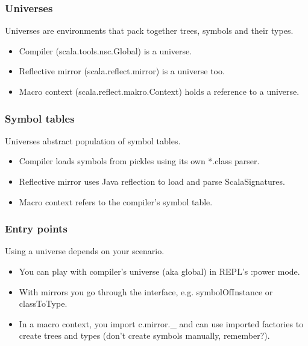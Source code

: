 \documentclass[hyperref={bookmarks=false}]{beamer}
\begin{document}
\begin{frame}[fragile]
\frametitle{Universes}

Universes are environments that pack together trees, symbols and their types.

\begin{itemize}
\item Compiler (scala.tools.nsc.Global) is a universe.
\item Reflective mirror (scala.reflect.mirror) is a universe too.
\item Macro context (scala.reflect.makro.Context) holds a reference to a universe.
\end{itemize}
\end{frame}

\begin{frame}[fragile]
\frametitle{Symbol tables}

Universes abstract population of symbol tables.

\begin{itemize}
\item Compiler loads symbols from pickles using its own *.class parser.
\item Reflective mirror uses Java reflection to load and parse ScalaSignatures.
\item Macro context refers to the compiler's symbol table.
\end{itemize}
\end{frame}

\begin{frame}[fragile]
\frametitle{Entry points}

Using a universe depends on your scenario.

\begin{itemize}
\item You can play with compiler's universe (aka global) in REPL's :power mode.
\item With mirrors you go through the 
interface, e.g. symbolOfInstance or classToType.
\item In a macro context, you import c.mirror.\_ and can use imported factories to create trees and types (don't create symbols manually, remember?).
\end{itemize}
\end{frame}
\end{document}
